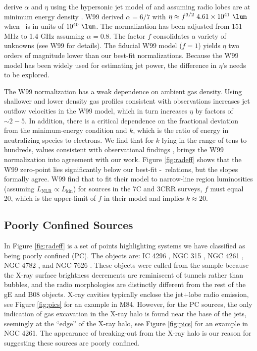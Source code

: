 \documentclass{emulateapj}
\begin{document}
\citet[][hereafter W99]{1999MNRAS.309.1017W} derive $\alpha$ and
$\eta$ using the hypersonic jet model of \citet{1991MNRAS.250..581F}
and assuming radio lobes are at minimum energy density \citep[see][for
  details]{1980ARA&A..18..165M}. W99 derived $\alpha = 6/7$ with $\eta
\approx f^{3/2}~4.61\times10^{41} ~\lum$ when \prad\ is in units of
$10^{40} ~\lum$. The normalization has been adjusted from 151 MHz to
1.4 GHz assuming $\alpha = 0.8$. The factor $f$ consolidates a variety
of unknowns (see W99 for details). The fiducial W99 model ($f=1$)
yields $\eta$ two orders of magnitude lower than our best-fit
normalizations. Because the W99 model has been widely used for
estimating jet power, the difference in $\eta$'s needs to be explored.

The W99 normalization has a weak dependence on ambient gas density.
Using shallower and lower density gas profiles consistent with
observations increases jet outflow velocities in the W99 model, which
in turn increases $\eta$ by factors of $\sim 2-5$. In addition, there
is a critical dependence on the fractional deviation from the
minimum-energy condition and $k$, which is the ratio of energy in
neutralizing species to electrons. We find that for $k$ lying in the
range of tens to hundreds, values consistent with observational
findings \citep{2005MNRAS.364.1343D, 2006MNRAS.372.1741D,
  2006ApJ...648..200D, birzan08}, brings the W99 normalization into
agreement with our work. Figure \ref{fig:radeff} shows that the W99
zero-point lies significantly below our best-fit
\pjet-\prad\ relations, but the slopes formally agree. W99 find that
to fit their model to narrow-line region luminosities (assuming
$L_{\mathrm{NLR}} \propto L_{\mathrm{kin}}$) for sources in the 7C and
3CRR surveys, $f$ must equal 20, which is the upper-limit of $f$ in
their model and implies $k \approx 20$.

\subsection{Poorly Confined Sources}
\label{sec:jet}

In Figure \ref{fig:radeff} is a set of points highlighting systems we
have classified as being poorly confined (PC). The objects are: IC
4296 \citep{1988ApJ...324..198K, 2003ApJ...585..677P}, NGC 315
\citep{1979ApJ...228L...9B, 1981A&A....95..250W}, NGC 4261
\citep{1997ApJ...484..186J, 2000ApJ...534..165J}, NGC 4782
\citep{2007ApJ...664..804M}, and NGC 7626 \citep{1985ApJ...291...32B}.
These objects were culled from the sample because the X-ray surface
brightness decrements are reminiscent of tunnels rather than bubbles,
and the radio morphologies are distinctly different from the rest of
the gE and B08 objects. X-ray cavities typically enclose the jet+lobe
radio emission, see Figure \ref{fig:pics} for an example in
M84. However, for the PC sources, the only indication of gas
excavation in the X-ray halo is found near the base of the jets,
seemingly at the ``edge'' of the X-ray halo, see Figure \ref{fig:pics}
for an example in NGC 4261. The appearance of breaking-out from the
X-ray halo is our reason for suggesting these sources are poorly
confined.
\end{document}
